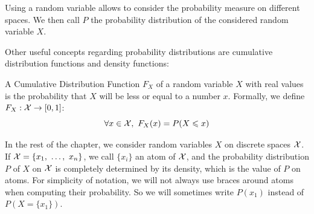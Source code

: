 Using a random variable allows to consider the probability measure on different spaces. We then call $P$ the probability distribution of the considered random variable $X$.

Other useful concepts regarding probability distributions are cumulative distribution functions and density functions:
\begin{definition}\label{def:cdf}
    A Cumulative Distribution Function $F_X$ of a random variable $X$ with real values is the probability that $X$ will be less or equal to a number $x$. Formally, we define $F_X:{\mathcal{X}}\rightarrow[0,1]$:
    \begin{equation*}
        \forall x\in{\mathcal{X}},~F_X(x)=P(X\leqslant x)
    \end{equation*}
\end{definition}


In the rest of the chapter, we consider random variables $X$ on discrete spaces ${\mathcal{X}}$. If ${\mathcal{X}}=\{x_1,~\dots,~x_n\}$, we call $\{x_i\}$ an atom of ${\mathcal{X}}$, and the probability distribution $P$ of $X$ on ${\mathcal{X}}$ is completely determined by its density, which is the value of $P$ on atoms. For simplicity of notation, we will not always use braces around atoms when computing their probability. So we will sometimes write $P(x_1)$ instead of $P(X=\{x_1\})$.

